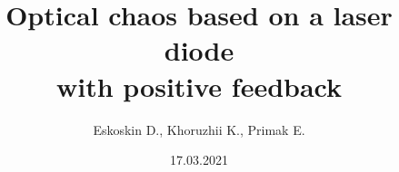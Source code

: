 \documentclass[]{beamer}
\title[Optical chaos]{Optical chaos based on a laser diode \\
with positive  feedback}
\author{
Eskoskin D., 
Khoruzhii K., Primak E.}
\institute[MIPT]
\begin{document}
\date{17.03.2021}
\maketitle






% 














\end{document}
